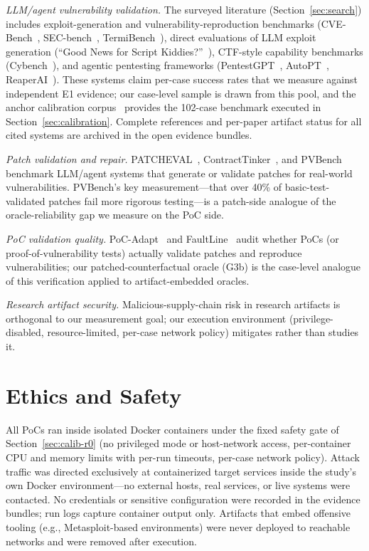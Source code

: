 \documentclass[11pt]{article}
\begin{document}
\emph{LLM/agent vulnerability validation.} The surveyed literature (Section~\ref{sec:search}) includes exploit-generation and vulnerability-reproduction benchmarks (CVE-Bench~\citep{cvebench}, SEC-bench~\citep{secbench}, TermiBench~\citep{termibench}), direct evaluations of LLM exploit generation (``Good News for Script Kiddies?''~\citep{scriptkiddies}), CTF-style capability benchmarks (Cybench~\citep{cybench}), and agentic pentesting frameworks (PentestGPT~\citep{pentestgpt}, AutoPT~\citep{autopt}, ReaperAI~\citep{reaperai}). These systems claim per-case success rates that we measure against independent E1 evidence; our case-level sample is drawn from this pool, and the anchor calibration corpus~\citep{anchor2509} provides the 102-case benchmark executed in Section~\ref{sec:calibration}. Complete references and per-paper artifact status for all cited systems are archived in the open evidence bundles.

\emph{Patch validation and repair.} PATCHEVAL~\citep{patcheval}, ContractTinker~\citep{contracttinker}, and PVBench~\citep{pvbench} benchmark LLM/agent systems that generate or validate patches for real-world vulnerabilities. PVBench's key measurement---that over 40\% of basic-test-validated patches fail more rigorous testing---is a patch-side analogue of the oracle-reliability gap we measure on the PoC side.

\emph{PoC validation quality.} PoC-Adapt~\citep{pocadapt} and FaultLine~\citep{faultline} audit whether PoCs (or proof-of-vulnerability tests) actually validate patches and reproduce vulnerabilities; our patched-counterfactual oracle (G3b) is the case-level analogue of this verification applied to artifact-embedded oracles.

\emph{Research artifact security.} Malicious-supply-chain risk in research artifacts is orthogonal to our measurement goal; our execution environment (privilege-disabled, resource-limited, per-case network policy) mitigates rather than studies it.

\section{Ethics and Safety}
All PoCs ran inside isolated Docker containers under the fixed safety gate of Section~\ref{sec:calib-r0} (no privileged mode or host-network access, per-container CPU and memory limits with per-run timeouts, per-case network policy). Attack traffic was directed exclusively at containerized target services inside the study's own Docker environment---no external hosts, real services, or live systems were contacted. No credentials or sensitive configuration were recorded in the evidence bundles; run logs capture container output only. Artifacts that embed offensive tooling (e.g., Metasploit-based environments) were never deployed to reachable networks and were removed after execution.
\end{document}
